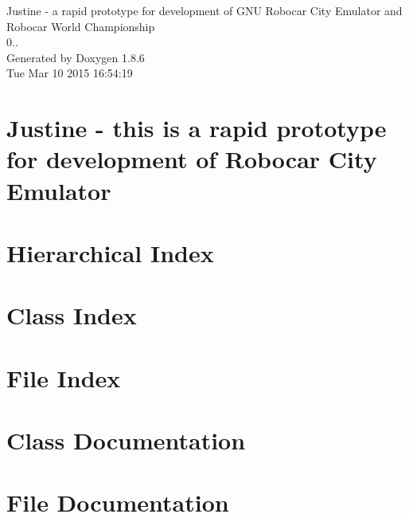 \documentclass[twoside]{book}
\newcommand{\clearemptydoublepage}{%
  \newpage{\pagestyle{empty}\cleardoublepage}%
}
\begin{document}
\hypersetup{pageanchor=false}
\begin{titlepage}
\vspace*{7cm}
\begin{center}%
{\Large Justine -\/ a rapid prototype for development of G\-N\-U Robocar City Emulator and Robocar World Championship \\[1ex]\large 0.. }\\
\vspace*{1cm}
{\large Generated by Doxygen 1.8.6}\\
\vspace*{0.5cm}
{\small Tue Mar 10 2015 16:54:19}\\
\end{center}
\end{titlepage}
\clearemptydoublepage
\tableofcontents
\clearemptydoublepage
{}
\hypersetup{pageanchor=true}

\chapter{Justine -\/ this is a rapid prototype for development of Robocar City Emulator}
\label{index}\hypertarget{index}{}
\chapter{Hierarchical Index}

\chapter{Class Index}

\chapter{File Index}

\chapter{Class Documentation}













\chapter{File Documentation}















\newpage
{}
{}
\printindex
\end{document}

